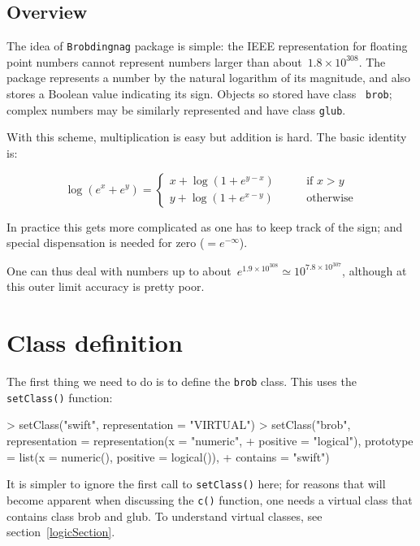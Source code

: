 \documentclass[a4paper]{article}
\begin{document}
\subsection{Overview}


The idea of {\tt Brobdingnag} package is simple: the IEEE
representation for floating point numbers cannot represent numbers
larger than about~$1.8\times 10^{308}$.  The package represents a
number by the natural logarithm of its magnitude, and also stores a
Boolean value indicating its sign.  Objects so stored have class {\tt
brob}; complex numbers may be similarly represented and have class
{\tt glub}.

With this scheme, multiplication is easy but addition is hard.  The
basic identity is:

\[
\log(e^x+e^y) = 
\left\{
\begin{array}{cc}
x+\log\left(1+e^{y-x}\right)\qquad &\mbox{if~$x>y$}\\
y+\log\left(1+e^{x-y}\right)\qquad &\mbox{otherwise}
\end{array}
\right.
\]

In practice this gets more complicated as one has to keep track of the
sign; and special dispensation is needed for zero ($=e^{-\infty}$).

One can thus deal with numbers up to about~$e^{1.9\times
10^{308}}\simeq 10^{7.8\times 10^{307}}$, although at this outer limit
accuracy is pretty poor.



\section{Class definition}

The first thing we need to do is to define the {\tt brob} class.  This
uses the {\tt setClass()} function:

\begin{Schunk}
\begin{Sinput}
> setClass("swift", representation = "VIRTUAL")
> setClass("brob", representation = representation(x = "numeric", 
+     positive = "logical"), prototype = list(x = numeric(), positive = logical()), 
+     contains = "swift")
\end{Sinput}
\end{Schunk}

It is simpler to ignore the first call to {\tt setClass()} here; for
reasons that will become apparent when discussing the {\tt c()}
function, one needs a virtual class that contains class brob and glub.
To understand virtual classes, see section~\ref{logicSection}.
\end{document}
